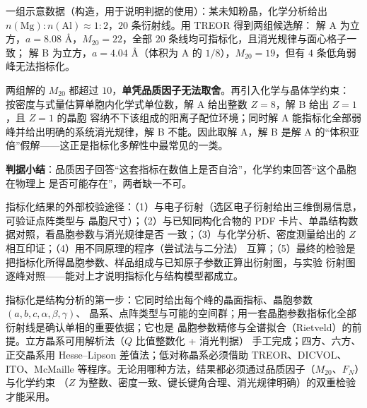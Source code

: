 \begin{example}
\begin{obs}
一组示意数据（构造，用于说明判据的使用）：某未知粉晶，化学分析给出
$n(\mathrm{Mg}):n(\mathrm{Al})\approx1:2$，$20$ 条衍射线。用 TREOR 得到两组候选解：
解 A 为立方，$a=8.08$ Å，$M_{20}=22$，全部 $20$ 条线均可指标化，且消光规律与面心格子一致；
解 B 为立方，$a=4.04$ Å（体积为 A 的 $1/8$），$M_{20}=19$，但有 $4$ 条低角弱峰无法指标化。
\end{obs}
\begin{infer}
两组解的 $M_{20}$ 都超过 $10$，\textbf{单凭品质因子无法取舍}。再引入化学与晶体学约束：
按密度与式量估算单胞内化学式单位数，解 A 给出整数 $Z=8$，解 B 给出 $Z=1$，且 $Z=1$ 的晶胞
容纳不下该组成的阳离子配位环境；同时解 A 能指标化全部弱峰并给出明确的系统消光规律，解 B
不能。因此取解 A，解 B 是解 A 的“体积亚倍”假解——这正是指标化多解性中最常见的一类。
\end{infer}
\textbf{判据小结}：品质因子回答“这套指标在数值上是否自洽”，化学约束回答“这个晶胞在物理上
是否可能存在”，两者缺一不可。
\end{example}

\begin{crosscheck}
指标化结果的外部校验途径：（1）与电子衍射（选区电子衍射给出三维倒易信息，可验证点阵类型与
晶胞尺寸）；（2）与已知同构化合物的 PDF 卡片、单晶结构数据对照，看晶胞参数与消光规律是否
一致；（3）与化学分析、密度测量给出的 $Z$ 相互印证；（4）用不同原理的程序（尝试法与二分法）
互算；（5）最终的检验是把指标化所得晶胞参数、样品组成与已知原子参数正算出衍射图，与实验
衍射图逐峰对照——能对上才说明指标化与结构模型都成立。
\end{crosscheck}

\begin{methodsum}
指标化是结构分析的第一步：它同时给出每个峰的晶面指标、晶胞参数 $(a,b,c,\alpha,\beta,\gamma)$、
晶系、点阵类型与可能的空间群；用一套晶胞参数指标化全部衍射线是确认单相的重要依据；它也是
晶胞参数精修与全谱拟合（Rietveld）的前提。立方晶系可用解析法（$Q$ 比值整数化 + 消光判据）
手工完成；四方、六方、正交晶系用 Hesse--Lipson 差值法；低对称晶系必须借助 TREOR、DICVOL、
ITO、McMaille 等程序。无论用哪种方法，结果都必须通过品质因子（$M_{20}$、$F_{N}$）与化学约束
（$Z$ 为整数、密度一致、键长键角合理、消光规律明确）的双重检验才能采用。
\end{methodsum}
